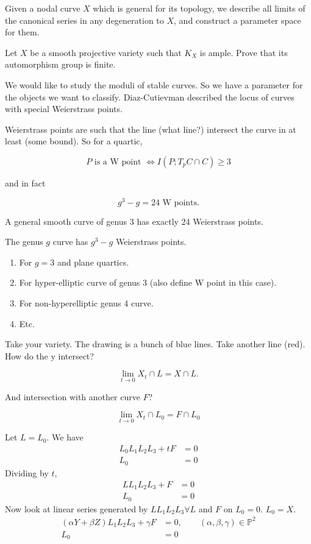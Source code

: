Given a nodal curve $X$ which is general for
its topology, we describe all limits of the
canonical series in any degeneration to $X$,
and construct a parameter space for them.

\begin{exercise}
\label{exercise-esteves1-1}
Let $X$ be a smooth projective variety such
that $K_X$ is ample. Prove that its
automorphism group is finite.
\end{exercise}

We would like to study the moduli of stable
curves. So we have a parameter for the
objects we want to classify. Diaz-Cutievman
described the locus of curves with special
Weierstrass points.

Weierstrass points are such that the line
(what line?) intersect the curve in at least
(some bound). So for a quartic,

$$
P\text{ is a W point }\iff I(P;T_pC\cap
C)\geq 3
$$

and in fact

$$
g^3-g=24\text{ W points.}
$$

\begin{remark}
\label{remark-esteves1-3}
A general smooth curve of genus 3 has exactly
24 Weierstrass points.
\end{remark}

\begin{exercise}
\label{exercise-esteves1-2}
The genus $g$ curve has $g^3-g$ Weierstrass
points.
\begin{enumerate}
\item[a.] For $g=3$ and plane quartics.
\item[b.] For hyper-elliptic curve of genus
$3$ (also define W point in this case).
\item[c.] For non-hyperelliptic genus 4
curve.
\item[d.] Etc.
\end{enumerate}
\end{exercise}

\medskip{}

Take your variety. The drawing is a bunch of
blue lines. Take another line (red). How do
the y intersect?

$$
\lim_{t\to 0}X_t\cap L=X\cap L.
$$

And intersection with another curve $F$?

$$
\lim_{t \to 0} X_t\cap L_0=F\cap L_0
$$

Let $L=L_0$. We have
$$
\begin{aligned}
L_0L_1L_2L_3+tF&=0\\
L_0&=0
\end{aligned}
$$
Dividing by $t$,
$$
\begin{aligned}
LL_1L_2L_3+F&=0\\
L_0&=0
\end{aligned}
$$
Now look at linear series generated by
$LL_1L_2L_3\forall L$ and $F$ on $L_0=0$.
$L_0=X$.
$$
\begin{aligned}
(\alpha Y+\beta Z)L_1L_2L_3+\gamma
F&=0,\qquad (\alpha,\beta,\gamma
)\in\mathbb{P}^2\\
L_0&=0
\end{aligned}
$$

